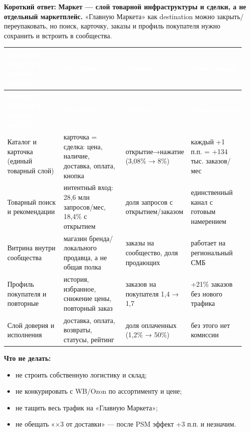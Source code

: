 \documentclass[10pt,a4paper]{article}
\begin{document}
\textbf{Короткий ответ:} \textbf{Маркет — слой товарной инфраструктуры и сделки, а не отдельный маркетплейс.} «Главную Маркета» как destination можно закрыть/переупаковать, но поиск, карточку, заказы и профиль покупателя нужно сохранить и встроить в сообщества.\par

\begingroup
\small
\setlength{\tabcolsep}{3pt}
\renewcommand{\arraystretch}{1.12}
\begin{longtable}{@{}>{\raggedright\arraybackslash}p{0.2437\linewidth}>{\raggedright\arraybackslash}p{0.2735\linewidth}>{\raggedright\arraybackslash}p{0.2140\linewidth}>{\raggedright\arraybackslash}p{0.2318\linewidth}@{}}
\rowcolor{blue}
\textcolor{white}{\textbf{Функция Маркета в целевой модели}} & \textcolor{white}{\textbf{Что делаем}} & \textcolor{white}{\textbf{Метрика}} & \textcolor{white}{\textbf{Почему важно}} \\
\endfirsthead
\rowcolor{blue}
\textcolor{white}{\textbf{Функция Маркета в целевой модели}} & \textcolor{white}{\textbf{Что делаем}} & \textcolor{white}{\textbf{Метрика}} & \textcolor{white}{\textbf{Почему важно}} \\
\endhead
\hline
Каталог и карточка (единый товарный слой) & карточка = сделка: цена, наличие, доставка, оплата, кнопка & открытие→нажатие (3,08\% → 8\%) & каждый +1 п.п. = +134 тыс. заказов/мес \\
Товарный поиск и рекомендации & интентный вход: 28,6 млн запросов/мес, 18,4\% с открытием & доля запросов с открытием/заказом & единственный канал с готовым намерением \\
Витрина внутри сообщества & магазин бренда/локального продавца, а не общая полка & заказы на сообщество, доля продающих & работает на региональный СМБ \\
Профиль покупателя и повторные & история, избранное, снижение цены, повторный заказ & заказов на покупателя 1,4 → 1,7 & +21\% заказов без нового трафика \\
Слой доверия и исполнения & доставка, оплата, возвраты, статусы, рейтинг & доля оплаченных (1,2\% → 50\%) & без этого нет комиссии \\
\hline
\end{longtable}
\endgroup
\vspace{4pt}

\noindent\textbf{Что не делать:}\par\vspace{4pt}

\begin{itemize}[leftmargin=1.35em,itemsep=2pt,topsep=3pt,parsep=0pt]
\item не строить собственную логистику и склад;
\item не конкурировать с WB/Ozon по ассортименту и цене;
\item не тащить весь трафик на «Главную Маркета»;
\item не обещать «×3 от доставки» — после PSM эффект +3 п.п. и незначим.
\end{itemize}
\end{document}
